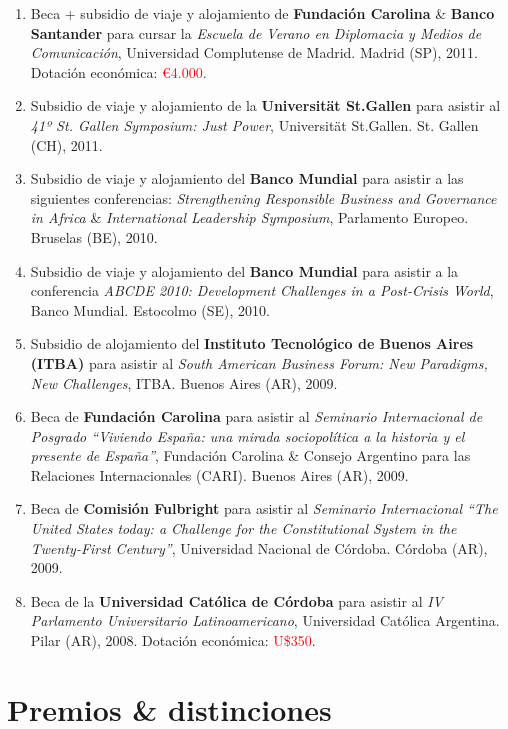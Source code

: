 \documentclass[12pt]{article}
\begin{document}
\begin{enumerate}
\item Beca + subsidio de viaje y alojamiento de {\bf Fundación Carolina} \& {\bf Banco Santander} para cursar la {\it Escuela de Verano en Diplomacia y Medios de Comunicación}, Universidad Complutense de Madrid. Madrid (SP), 2011. Dotación económica: \textcolor{red}{€4.000}.

\item Subsidio de viaje y alojamiento de la {\bf Universität St.Gallen} para asistir al {\it 41º St. Gallen Symposium: Just Power}, Universität St.Gallen. St. Gallen (CH), 2011.

\item Subsidio de viaje y alojamiento del {\bf Banco Mundial} para asistir a las siguientes conferencias: {\it Strengthening Responsible Business and Governance in Africa} \& {\it International Leadership Symposium}, Parlamento Europeo. Bruselas (BE), 2010.

\item Subsidio de viaje y alojamiento del {\bf Banco Mundial} para asistir a la conferencia {\it ABCDE 2010: Development Challenges in a Post-Crisis World}, Banco Mundial. Estocolmo (SE), 2010.

\item Subsidio de alojamiento del {\bf Instituto Tecnológico de Buenos Aires (ITBA)} para asistir al {\it South American Business Forum: New Paradigms, New Challenges}, ITBA. Buenos Aires (AR), 2009.

\item Beca de {\bf Fundación Carolina} para asistir al {\it Seminario Internacional de Posgrado “Viviendo España: una mirada sociopolítica a la historia y el presente de España”}, Fundación Carolina \& Consejo Argentino para las Relaciones Internacionales (CARI). Buenos Aires (AR), 2009.

\item Beca de {\bf Comisión Fulbright} para asistir al {\it Seminario Internacional “The United States today: a Challenge for the Constitutional System in the Twenty-First Century”}, Universidad Nacional de Córdoba. Córdoba (AR), 2009.

\item Beca de la {\bf Universidad Católica de Córdoba} para asistir al {\it IV Parlamento Universitario Latinoamericano}, Universidad Católica Argentina. Pilar (AR), 2008. Dotación económica: \textcolor{red}{U\$350}.

\end{enumerate}

\section*{Premios \& distinciones}
\end{document}
